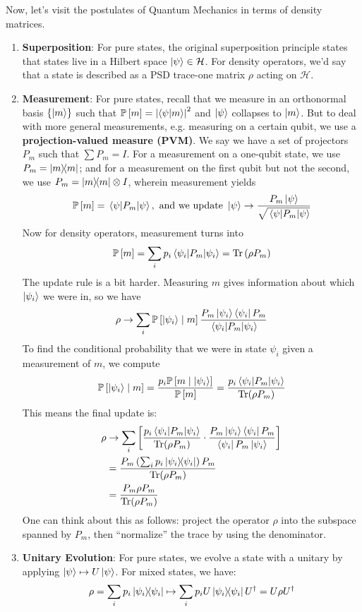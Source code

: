 Now, let's visit the postulates of Quantum Mechanics in terms of density matrices.
\begin{theorem}
    \begin{enumerate}
    \item \textbf{Superposition}: For pure states, the original superposition principle states that states live in a Hilbert space $\ket{\psi} \in \mathcal{H}$. For density operators,
    we'd say that a state is described as a PSD trace-one matrix $\rho$ acting on $\mathcal{H}$.
    \item \textbf{Measurement}: For pure states, recall that we measure in an orthonormal basis $\{\ket{m}\}$ such that
    $\mathbb{P}\left[ m \right] = \qty|\braket{\psi}{m}|^2$ and $\ket{\psi}$ collapses to $\ket{m}$. But to deal with more general measurements,
    e.g. measuring on a certain qubit, we use a \textbf{projection-valued measure (PVM)}. We say we have a set of projectors
    $P_m$ such that $\sum P_m = I$. For a measurement on a one-qubit state, we use $P_m = \ketbra{m}{m}$; and for a measurement on the first qubit but not the second,
    we use $P_m = \ketbra{m}{m} \otimes I$, wherein measurement yields
    \[ \mathbb{P}\left[ m \right] = \mel{\psi}{P_m}{\psi}, \text{ and we update } \ket{\psi} \to \frac{P_m \ket{\psi}}{\sqrt{\mel{\psi}{P_m}{\psi}}} \]
    Now for density operators, measurement turns into
    \[ \mathbb{P}\left[ m \right] = \sum_i p_i \mel{\psi_i}{P_m}{\psi_i} = \Tr\qty(\rho P_m) \]
    The update rule is a bit harder. Measuring $m$ gives information about which $\ket{\psi_i}$ we were in, so we have 
    \[ \rho \to \sum_i \mathbb{P}\left[ \ket{\psi_i} \mid m \right] \frac{P_m \ket{\psi_i} \bra{\psi_i} P_m}{\mel{\psi_i}{P_m}{\psi_i}} \]
    To find the conditional probability that we were in state $\psi_i$ given a measurement of $m$, we compute 
    \[ \mathbb{P}\left[ \ket{\psi_i} \mid m \right] = \frac{p_i \mathbb{P}\left[ m \mid \ket{\psi_i} \right]}{\mathbb{P}\left[ m \right]} = \frac{p_i\mel{\psi_i}{P_m}{\psi_i}}{\Tr(\rho P_m)} \]
    This means the final update is:
    \begin{align*}
        \rho &\to \sum_i \left[\frac{p_i\mel{\psi_i}{P_m}{\psi_i}}{\Tr(\rho P_m)} \cdot \frac{P_m \ket{\psi_i} \bra{\psi_i} P_m}{\bra{\psi_i} P_m \ket{\psi_i}}\right] \\
        &= \frac{P_m \left(\sum_i p_i \ketbra{\psi_i}{\psi_i}\right) P_m}{\Tr(\rho P_m)}\\
        &= \frac{P_m \rho P_m}{\Tr(\rho P_m)}
    \end{align*}
    One can think about this as follows: project the operator $\rho$ into the subspace spanned by $P_m$,
    then ``normalize'' the trace by using the denominator.
    \item \textbf{Unitary Evolution}: For pure states, we evolve a state with a unitary by applying $\ket{\psi} \mapsto U\ket{\psi}$. For mixed states, we have:
    \[ \rho = \sum_i p_i \ketbra{\psi_i}{\psi_i} \mapsto \sum_i p_i U \ketbra{\psi_i}{\psi_i} U^{\dagger} = U \rho U^{\dagger} \]
    \end{enumerate}
\end{theorem}

